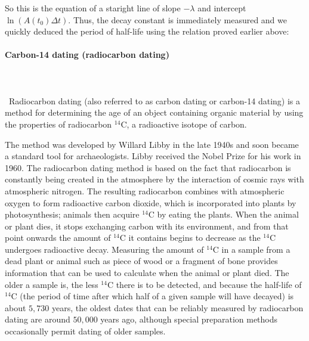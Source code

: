 	So this is the equation of a staright line of slope $-\lambda$ and intercept $\ln(A(t_0)\Delta t)$. Thus, the decay constant is immediately measured and we quickly deduced the period of half-life using the relation proved earlier above:
	
	
	\pagebreak
	\paragraph{Carbon-14 dating (radiocarbon dating)}\mbox{}\\\\\
	Radiocarbon dating (also referred to as carbon dating or carbon-14 dating) is a method for determining the age of an object containing organic material by using the properties of radiocarbon $^{14}\mathrm{C}$, a radioactive isotope of carbon.
	
	The method was developed by Willard Libby in the late 1940s and soon became a standard tool for archaeologists. Libby received the Nobel Prize for his work in 1960. The radiocarbon dating method is based on the fact that radiocarbon is constantly being created in the atmosphere by the interaction of cosmic rays with atmospheric nitrogen. The resulting radiocarbon combines with atmospheric oxygen to form radioactive carbon dioxide, which is incorporated into plants by photosynthesis; animals then acquire $^{14}\mathrm{C}$ by eating the plants. When the animal or plant dies, it stops exchanging carbon with its environment, and from that point onwards the amount of $^{14}\mathrm{C}$ it contains begins to decrease as the $^{14}\mathrm{C}$ undergoes radioactive decay. Measuring the amount of $^{14}\mathrm{C}$ in a sample from a dead plant or animal such as piece of wood or a fragment of bone provides information that can be used to calculate when the animal or plant died. The older a sample is, the less $^{14}\mathrm{C}$ there is to be detected, and because the half-life of $^{14}\mathrm{C}$ (the period of time after which half of a given sample will have decayed) is about $5,730$ years, the oldest dates that can be reliably measured by radiocarbon dating are around $50,000$ years ago, although special preparation methods occasionally permit dating of older samples.

